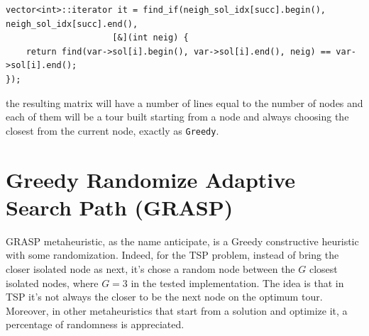 \begin{lstlisting}
vector<int>::iterator it = find_if(neigh_sol_idx[succ].begin(), neigh_sol_idx[succ].end(),
					 [&](int neig) {
	return find(var->sol[i].begin(), var->sol[i].end(), neig) == var->sol[i].end();
});
\end{lstlisting}

the resulting matrix will have a number of lines equal to the number of nodes and each of them will be a tour built starting from a node and always choosing the closest from the current node, exactly as \texttt{Greedy}.

\section{Greedy Randomize Adaptive Search Path (GRASP)}
GRASP metaheuristic, as the name anticipate, is a Greedy constructive heuristic with some randomization. Indeed, for the TSP problem, instead of bring the closer isolated node as next, it's chose a random node between the $ G $ closest isolated nodes, where $ G = 3 $ in the tested implementation.
The idea is that in TSP it's not always the closer to be the next node on the optimum tour. Moreover, in other metaheuristics that start from a solution and optimize it, a percentage of randomness is appreciated.

